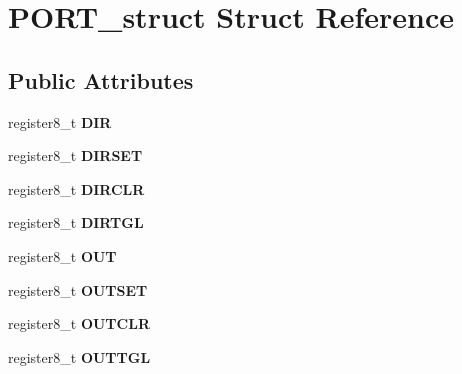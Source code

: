 \hypertarget{struct_p_o_r_t__struct}{}\section{P\+O\+R\+T\+\_\+struct Struct Reference}
\label{struct_p_o_r_t__struct}
\subsection*{Public Attributes}
\begin{DoxyCompactItemize}
\item 
register8\+\_\+t {\bfseries D\+IR}\hypertarget{struct_p_o_r_t__struct_ae70ac724d575f7902ceadd5af7ec3163}{}\label{struct_p_o_r_t__struct_ae70ac724d575f7902ceadd5af7ec3163}

\item 
register8\+\_\+t {\bfseries D\+I\+R\+S\+ET}\hypertarget{struct_p_o_r_t__struct_a3c0d316f069740be22c224189546b8d5}{}\label{struct_p_o_r_t__struct_a3c0d316f069740be22c224189546b8d5}

\item 
register8\+\_\+t {\bfseries D\+I\+R\+C\+LR}\hypertarget{struct_p_o_r_t__struct_a7459f47076d9cf3f8581c8a1410f3f6a}{}\label{struct_p_o_r_t__struct_a7459f47076d9cf3f8581c8a1410f3f6a}

\item 
register8\+\_\+t {\bfseries D\+I\+R\+T\+GL}\hypertarget{struct_p_o_r_t__struct_a4199abf82b32e254b4021486513847b9}{}\label{struct_p_o_r_t__struct_a4199abf82b32e254b4021486513847b9}

\item 
register8\+\_\+t {\bfseries O\+UT}\hypertarget{struct_p_o_r_t__struct_a8b4f091f44c465de85b5dd22dc45635a}{}\label{struct_p_o_r_t__struct_a8b4f091f44c465de85b5dd22dc45635a}

\item 
register8\+\_\+t {\bfseries O\+U\+T\+S\+ET}\hypertarget{struct_p_o_r_t__struct_a379bcc66956595a85e2b9eb2a7f8d35d}{}\label{struct_p_o_r_t__struct_a379bcc66956595a85e2b9eb2a7f8d35d}

\item 
register8\+\_\+t {\bfseries O\+U\+T\+C\+LR}\hypertarget{struct_p_o_r_t__struct_aada5adbe29b3eb8bcd743f4011ed016a}{}\label{struct_p_o_r_t__struct_aada5adbe29b3eb8bcd743f4011ed016a}

\item 
register8\+\_\+t {\bfseries O\+U\+T\+T\+GL}\hypertarget{struct_p_o_r_t__struct_aff2002aa5bf8c2f30663e4cad161cfe9}{}\label{struct_p_o_r_t__struct_aff2002aa5bf8c2f30663e4cad161cfe9}


\end{DoxyCompactItemize}
